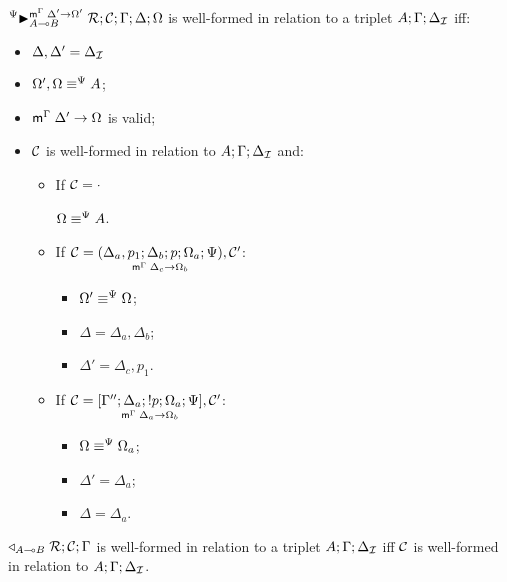 \begin{definition}

$\matstateb{A \lolli B}{\rulestk}{\lstack{C}}{\Gamma}{\Delta}{\Omega}{\Delta'
\rightarrow \Omega'}{\Psi}$ is well-formed in relation to a triplet $A; \Gamma;
\deltan$ iff:

\begin{itemize}[leftmargin=*]
   \item $\Delta, \Delta' = \deltan$
   \item $\feqa{\Omega', \Omega}{A}{\Psi}{\Psi}$;
   \item $\mz{\Gamma}{\Delta'}{\Omega}$ is valid;
   \item $\lstack{C}$ is well-formed in relation to $A; \Gamma; \deltan$ and:
   \begin{itemize}[leftmargin=\secondm]
      \item If $\lstack{C} = \cdot$
   
         $\feqa{\Omega}{A}{\Psi}{\Psi}$.
   
      \item If $\lstack{C} = \lframe{\Delta_a,
   p_1}{\Delta_b}{p}{\Omega_a; \Psi}{\Delta_c}{\Omega_b}, \lstack{C'}$:
      \begin{itemize}[leftmargin=\thirdm]
         \item $\feqa{\Omega'}{\Omega}{\Psi}{\Psi}$;
         \item $\Delta = \Delta_a, \Delta_b$;
         \item $\Delta' = \Delta_c, p_1$.
      \end{itemize}

      \item If $\lstack{C} = \pframe{\Gamma''}{\Delta_a}{\bang
         p}{\Omega_a; \Psi}{\Delta_a}{\Omega_b}, \lstack{C'}$:
      \begin{itemize}[leftmargin=\thirdm]
         \item $\feqa{\Omega}{\Omega_a}{\Psi}{\Psi}$;
         \item $\Delta' = \Delta_a$;
         \item $\Delta = \Delta_a$.
      \end{itemize}
   \end{itemize}
\end{itemize}

\end{definition}

\begin{definition}
$\contstate{A \lolli B}{\rulestk}{\lstack{C}}{\Gamma}$ is well-formed in
relation to a triplet $A; \Gamma; \deltan$ iff $\lstack{C}$ is well-formed in
relation to $A; \Gamma; \deltan$.
\end{definition}

